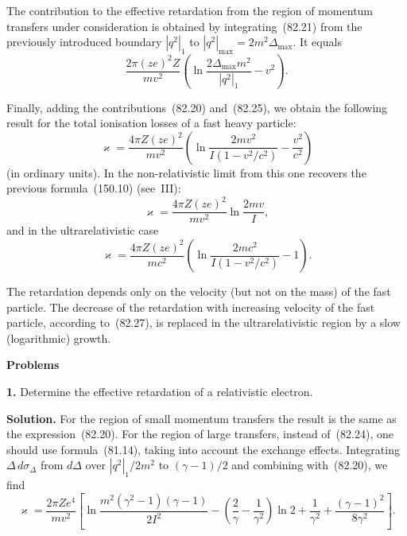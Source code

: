 The contribution to the effective retardation from the region of momentum transfers under consideration is obtained by integrating~(82.21) from the previously introduced boundary $|q^2|_1$ to $|q^2|_\text{max} = 2m^2\Delta_\text{max}$. It equals
\begin{equation}
\frac{2\pi(ze)^2 Z}{mv^2}\left(\ln\frac{2\Delta_\text{max}m^2}{|q^2|_1} - v^2\right).
\tag{82.26}
\end{equation}

Finally, adding the contributions~(82.20) and~(82.25), we obtain the following result for the total ionisation losses of a fast heavy particle:
\begin{equation}
\varkappa = \frac{4\pi Z(ze)^2}{mv^2}\left(\ln\frac{2mv^2}{I(1-v^2/c^2)} - \frac{v^2}{c^2}\right)
\tag{82.27}
\end{equation}
(in ordinary units). In the non-relativistic limit from this one recovers the previous formula~(150.10) (see~III):
\begin{equation}
\varkappa = \frac{4\pi Z(ze)^2}{mv^2}\ln\frac{2mv}{I},
\tag{82.28}
\end{equation}
and in the ultrarelativistic case
\begin{equation}
\varkappa = \frac{4\pi Z(ze)^2}{mc^2}\left(\ln\frac{2mc^2}{I(1-v^2/c^2)} - 1\right).
\tag{82.29}
\end{equation}

The retardation depends only on the velocity (but not on the mass) of the fast particle. The decrease of the retardation with increasing velocity of the fast particle, according to~(82.27), is replaced in the ultrarelativistic region by a slow (logarithmic) growth.

\textbf{Problems}

\textbf{1.} Determine the effective retardation of a relativistic electron.

\textbf{Solution.} For the region of small momentum transfers the result is the same as the expression~(82.20). For the region of large transfers, instead of~(82.24), one should use formula~(81.14), taking into account the exchange effects. Integrating $\Delta\,d\sigma_\Delta$ from $d\Delta$ over $|q^2|_1/2m^2$ to $(\gamma - 1)/2$ and combining with~(82.20), we find
\begin{equation}
\varkappa = \frac{2\pi Ze^4}{mv^2}\left[\ln\frac{m^2(\gamma^2-1)(\gamma-1)}{2I^2}  - \left(\frac{2}{\gamma}-\frac{1}{\gamma^2}\right)\ln 2 + \frac{1}{\gamma^2} + \frac{(\gamma-1)^2}{8\gamma^2}\right]. \tag{1}
\end{equation}

